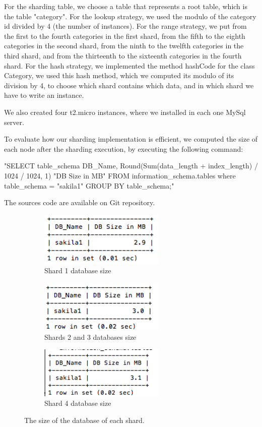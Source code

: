 \documentclass[10pt, conference]{IEEEtran}
\begin{document}
For the sharding table, we choose a table that represents a root table, which is the table "category". For the lookup strategy, we used the modulo of the category id divided by 4 (the number of instances). For the range strategy, we put from the first to the fourth categories in the first shard, from the fifth to the eighth categories in the second shard, from the ninth to the twelfth categories in the third shard, and from the thirteenth to the sixteenth categories in the fourth shard. For the hash strategy, we implemented the method hashCode for the class Category, we used this hash method, which we computed its modulo of its division by 4, to choose which shard contains which data, and in which shard we have to write an instance.

We also created four t2.micro instances, where we installed in each one MySql server. 

To evaluate how our sharding implementation is efficient, we computed the size of each node after the sharding execution, by executing the following command:

"SELECT table\_schema                                        DB\_Name,     Round(Sum(data\_length + index\_length) / 1024 / 1024, 1) "DB Size in MB"  FROM   information\_schema.tables  where table\_schema = "sakila1" GROUP  BY table\_schema;" 

The sources code are available on Git repository.



\begin{figure}
	\centering
	\begin{subfigure}[b]{0.33\textwidth}
	\includegraphics[width=6cm]{size1.png}
	\caption{Shard 1 database size}
	\end{subfigure}
	\begin{subfigure}[b]{0.33\textwidth}
		\includegraphics[width=6cm]{size2.png}
		\caption{Shards 2 and 3 databases size}
	\end{subfigure}
	\begin{subfigure}[b]{0.33\textwidth}
		\includegraphics[width=6cm]{size3.png}
		\caption{Shard 4 database size}
	\end{subfigure}
	\caption{The size of the database of each shard.}
	\label{fig:sizeShards}
\end{figure} 
\end{document}
